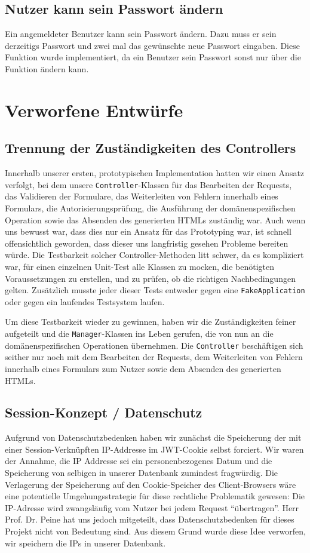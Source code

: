 \documentclass[12pt,DIV14,BCOR10mm,a4paper,parskip=half-,headsepline,headinclude,english,ngerman,bibliography=totocnumbered]{scrreprt}
\begin{document}
\section{Nutzer kann sein Passwort ändern}
Ein angemeldeter Benutzer kann sein Passwort ändern. Dazu muss er sein derzeitigs Passwort und zwei mal das gewünschte neue Passwort eingaben. Diese Funktion wurde implementiert, da ein Benutzer sein Passwort sonst nur über die  Funktion ändern kann.


\chapter{Verworfene Entwürfe}

\section{Trennung der Zuständigkeiten des Controllers}

Innerhalb unserer ersten, prototypischen Implementation hatten wir einen Ansatz verfolgt, bei dem unsere \texttt{Controller}-Klassen für das Bearbeiten der Requests, das Validieren der Formulare, das Weiterleiten von Fehlern innerhalb eines Formulars, die Autorisierungsprüfung, die Ausführung der domänenspezifischen Operation sowie das Absenden des generierten HTMLs zuständig war.
Auch wenn uns bewusst war, dass dies nur ein Ansatz für das Prototyping war, ist schnell offensichtlich geworden, dass dieser uns langfristig gesehen Probleme bereiten würde.
Die Testbarkeit solcher Controller-Methoden litt schwer, da es kompliziert war, für einen einzelnen Unit-Test alle Klassen zu mocken, die benötigten Voraussetzungen zu erstellen, und zu prüfen, ob die richtigen Nachbedingungen gelten.
Zusätzlich musste jeder dieser Tests entweder gegen eine \texttt{FakeApplication} oder gegen ein laufendes Testsystem laufen.

Um diese Testbarkeit wieder zu gewinnen, haben wir die Zuständigkeiten feiner aufgeteilt und die \texttt{Manager}-Klassen ins Leben gerufen, die von nun an die domänenspezifischen Operationen übernehmen.
Die \texttt{Controller} beschäftigen sich seither nur noch mit dem Bearbeiten der Requests, dem Weiterleiten von Fehlern innerhalb eines Formulars zum Nutzer sowie dem Absenden des generierten HTMLs.

\section{Session-Konzept / Datenschutz}
Aufgrund von Datenschutzbedenken haben wir zunächst die Speicherung der mit einer Session-Verknüpften IP-Addresse im JWT-Cookie selbst forciert. Wir waren der Annahme, die IP Addresse sei ein personenbezogenes Datum und die Speicherung von selbigen in unserer Datenbank zumindest fragwürdig. Die Verlagerung der Speicherung auf den Cookie-Speicher des Client-Browsers wäre eine potentielle Umgehungsstrategie für diese rechtliche Problematik gewesen: Die IP-Adresse wird zwangsläufig vom Nutzer bei jedem Request \enquote{übertragen}. Herr Prof. Dr. Peine hat uns jedoch mitgeteilt, dass Datenschutzbedenken für dieses Projekt nicht von Bedeutung sind. Aus diesem Grund wurde diese Idee verworfen, wir speichern die IPs in unserer Datenbank.
\end{document}

